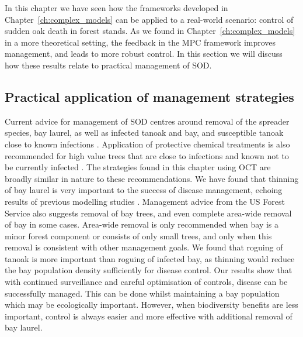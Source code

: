 In this chapter we have seen how the frameworks developed in Chapter~\ref{ch:complex_models} can be applied to a real-world scenario: control of sudden oak death in forest stands. As we found in Chapter~\ref{ch:complex_models} in a more theoretical setting, the feedback in the MPC framework improves management, and leads to more robust control. In this section we will discuss how these results relate to practical management of SOD.

\subsection{Practical application of management strategies\label{sec:ch6:discussion_practical}}

Current advice for management of SOD centres around removal of the spreader species, bay laurel, as well as infected tanoak and bay, and susceptible tanoak close to known infections \citep{comtf_sudden_2014}. Application of protective chemical treatments is also recommended for high value trees that are close to infections and known not to be currently infected \citep{lee_protecting_2010}. The strategies found in this chapter using OCT are broadly similar in nature to these recommendations. We have found that thinning of bay laurel is very important to the success of disease management, echoing results of previous modelling studies \citep{cobb_resiliency_2017,ndeffo_mbah_optimization_2010}. Management advice from the US Forest Service \citep{swiecki_reference_2013} also suggests removal of bay trees, and even complete area-wide removal of bay in some cases. Area-wide removal is only recommended when bay is a minor forest component or consists of only small trees, and only when this removal is consistent with other management goals. We found that roguing of tanoak is more important than roguing of infected bay, as thinning would reduce the bay population density sufficiently for disease control. Our results show that with continued surveillance and careful optimisation of controls, disease can be successfully managed. This can be done whilst maintaining a bay population which may be ecologically important. However, when biodiversity benefits are less important, control is always easier and more effective with additional removal of bay laurel.

